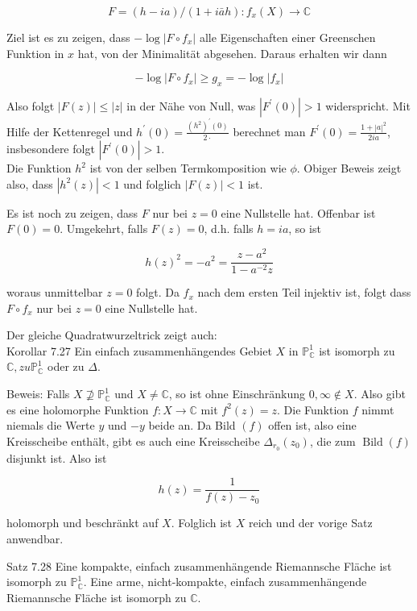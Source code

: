 \documentclass[10pt, letterpaper]{article}
\begin{document}
$$
F=(h-i a) /(1+i \bar{a} h): f_{x}(X) \longrightarrow \mathbb{C}
$$

Ziel ist es zu zeigen, dass $-\log \left|F \circ f_{x}\right|$ alle Eigenschaften einer Greenschen Funktion in $x$ hat, von der Minimalität abgesehen. Daraus erhalten wir dann

$$
-\log \left|F \circ f_{x}\right| \geqslant g_{x}=-\log \left|f_{x}\right|
$$

Also folgt $|F(z)| \leqslant|z|$ in der Nähe von Null, was $\left|F^{\prime}(0)\right|>1$ widerspricht. Mit Hilfe der Kettenregel und $h^{\prime}(0)=\frac{\left(h^{2}\right)^{\prime}(0)}{2 \cdot}$ berechnet man $F^{\prime}(0)=\frac{1+|a|^{2}}{2 i a}$, insbesondere folgt $\left|F^{\prime}(0)\right|>1$.\\
Die Funktion $h^{2}$ ist von der selben Termkomposition wie $\phi$. Obiger Beweis zeigt also, dass $\left|h^{2}(z)\right|<1$ und folglich $|F(z)|<1$ ist.

Es ist noch zu zeigen, dass $F$ nur bei $z=0$ eine Nullstelle hat. Offenbar ist $F(0)=0$. Umgekehrt, falls $F(z)=0$, d.h. falls $h=i a$, so ist

$$
h(z)^{2}=-a^{2}=\frac{z-a^{2}}{1-a^{-2} z}
$$

woraus unmittelbar $z=0$ folgt. Da $f_{x}$ nach dem ersten Teil injektiv ist, folgt dass $F \circ f_{x}$ nur bei $z=0$ eine Nullstelle hat.

Der gleiche Quadratwurzeltrick zeigt auch:\\
Korollar 7.27 Ein einfach zusammenhängendes Gebiet $X$ in $\mathbb{P}_{\mathbb{C}}^{1}$ ist isomorph zu $\mathbb{C}, z u \mathbb{P}_{\mathbb{C}}^{1}$ oder zu $\Delta$.

Beweis: Falls $X \nsupseteq \mathbb{P}_{\mathbb{C}}^{1}$ und $X \neq \mathbb{C}$, so ist ohne Einschränkung $0, \infty \notin X$. Also gibt es eine holomorphe Funktion $f: X \rightarrow \mathbb{C}$ mit $f^{2}(z)=z$. Die Funktion $f$ nimmt niemals die Werte $y$ und $-y$ beide an. Da Bild $(f)$ offen ist, also eine Kreisscheibe enthält, gibt es auch eine Kreisscheibe $\Delta_{r_{0}}\left(z_{0}\right)$, die zum $\operatorname{Bild}(f)$ disjunkt ist. Also ist

$$
h(z)=\frac{1}{f(z)-z_{0}}
$$

holomorph und beschränkt auf $X$. Folglich ist $X$ reich und der vorige Satz anwendbar.

Satz 7.28 Eine kompakte, einfach zusammenhängende Riemannsche Fläche ist isomorph zu $\mathbb{P}_{\mathbb{C}}^{1}$. Eine arme, nicht-kompakte, einfach zusammenhängende Riemannsche Fläche ist isomorph zu $\mathbb{C}$.
\end{document}
